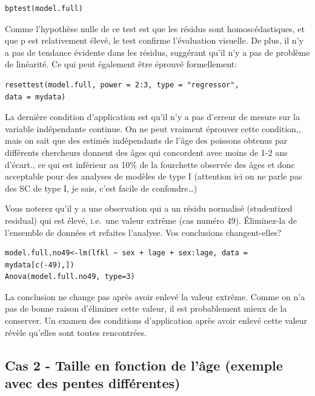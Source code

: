 \documentclass[12pt,]{book}
\begin{document}
\begin{verbatim}
bptest(model.full)
\end{verbatim}

Comme l'hypothèse nulle de ce test est que les résidus sont
homoscédastiques, et que p est relativement élevé, le test confirme
l'évaluation visuelle.
De plus, il n'y a pas de tendance évidente dans les résidus, suggérant
qu'il n'y a pas de problème de linéarité. Ce qui peut également être
éprouvé formellement:

\begin{verbatim}
resettest(model.full, power = 2:3, type = "regressor",
data = mydata)
\end{verbatim}

La dernière condition d'application est qu'il n'y a pas d'erreur de
mesure sur la variable indépendante continue. On ne peut vraiment
éprouver cette condition,, mais on sait que des estimés indépendants
de l'âge des poissons obtenus par différents chercheurs donnent des
âges qui concordent avec moins de 1-2 ans d'écart., ce qui est inférieur
au 10\% de la fourchette observée des âges et donc acceptable pour
des analyses de modèles de type I (attention ici on ne parle pas des SC
de type I, je sais, c'est facile de confondre\ldots{})

Vous noterez qu'il y a une observation qui a un résidu normalisé
(studentized residual) qui est élevé, i.e.~une valeur extrême (cas
numéro 49). Éliminez-la de l'ensemble de données et refaites l'analyse.
Vos conclusions changent-elles?

\begin{verbatim}
model.full.no49<-lm(lfkl ~ sex + lage + sex:lage, data =
mydata[c(-49),])
Anova(model.full.no49, type=3)
\end{verbatim}

La conclusion ne change pas après avoir enlevé la valeur extrême.
Comme on n'a pas de bonne raison d'éliminer cette valeur, il est
probablement mieux de la conserver. Un examen des conditions
d'application après avoir enlevé cette valeur révèle qu'elles sont toutes
rencontrées.

\hypertarget{cas-2---taille-en-fonction-de-luxe2ge-exemple-avec-des-pentes-diffuxe9rentes}{%
\subsection{Cas 2 - Taille en fonction de l'âge (exemple avec des pentes différentes)}\label{cas-2---taille-en-fonction-de-luxe2ge-exemple-avec-des-pentes-diffuxe9rentes}}
\end{document}
